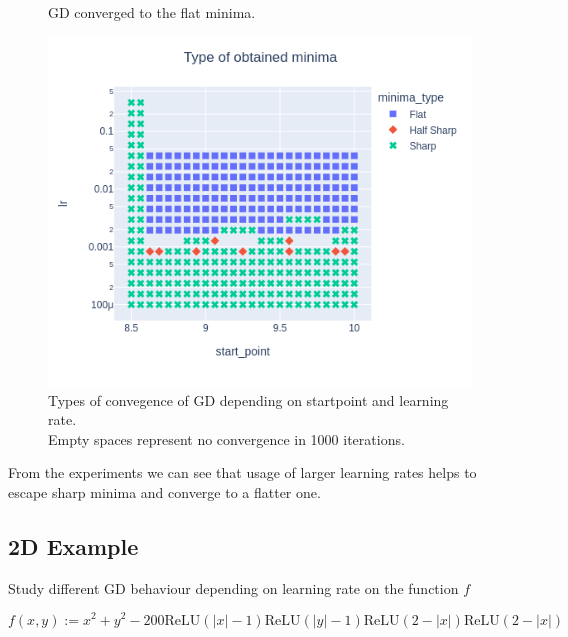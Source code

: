 \documentclass{article}
\theoremstyle{definition}
\begin{document}
\begin{figure}[!htb]
      \caption{GD converged to the flat minima.}
    \endminipage
\end{figure}

\begin{figure}[!htb]
    \begin{center}
        \caption{
            Types of convegence of GD depending on startpoint and learning rate. \\
            Empty spaces represent no convergence in 1000 iterations.
        }
        \includegraphics[scale=0.7]{1d_GD_results.png}        
    \end{center}
\end{figure}

From the experiments we can see that usage of larger learning rates
helps to escape sharp minima and converge to a flatter one.

\clearpage

\subsection{2D Example}
Study different GD behaviour depending on learning rate on
the function $f$

$$
f(x, y):=x^2+y^2-200 \mathrm{ReLU}(|x|-1) \mathrm{ReLU}(|y|-1) \mathrm{ReLU}(2-|x|) \mathrm{ReLU}(2-|x|)
$$
\end{document}
